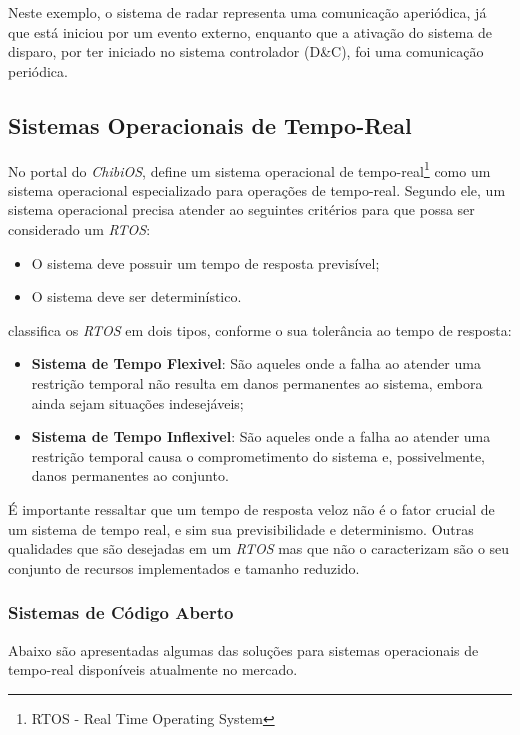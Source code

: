 Neste exemplo, o sistema de radar representa uma comunicação aperiódica, já que está iniciou por um evento externo, enquanto que a ativação do sistema de disparo, por ter iniciado no sistema controlador (D\&C), foi uma comunicação periódica.

\subsection{Sistemas Operacionais de Tempo-Real}

No portal do \emph{ChibiOS},  define um sistema operacional de tempo-real\footnote{RTOS - Real Time Operating System} como um sistema operacional especializado para operações de tempo-real. Segundo ele, um sistema operacional precisa atender ao seguintes critérios para que possa ser considerado um \emph{RTOS}:

\begin{itemize}
	\item O sistema deve possuir um tempo de resposta previsível;
	\item O sistema deve ser determinístico.
\end{itemize}

 classifica os \emph{RTOS} em dois tipos, conforme o sua tolerância ao tempo de resposta:

\begin{itemize}
	\item \textbf{Sistema de Tempo Flexivel}: São aqueles onde a falha ao atender uma restrição temporal não resulta em danos permanentes ao sistema, embora ainda sejam situações indesejáveis;
	\item \textbf{Sistema de Tempo Inflexivel}: São aqueles onde a falha ao atender uma restrição temporal causa o comprometimento do sistema e, possivelmente, danos permanentes ao conjunto.
\end{itemize}

É importante ressaltar que um tempo de resposta veloz não é o fator crucial de um sistema de tempo real, e sim sua previsibilidade e determinismo. Outras qualidades que são desejadas em um \emph{RTOS} mas que não o caracterizam são o seu conjunto de recursos implementados e tamanho reduzido.

\subsubsection{Sistemas de Código Aberto}

Abaixo são apresentadas algumas das soluções para sistemas operacionais de tempo-real disponíveis atualmente no mercado.

